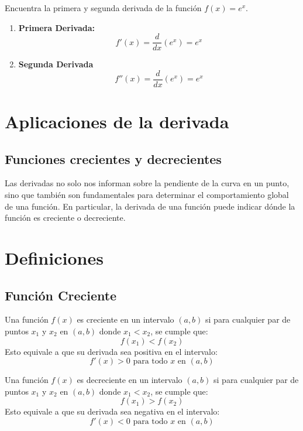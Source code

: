 \begin{example}
    Encuentra la primera y segunda derivada de la función \( f(x) = e^x \).

\begin{enumerate}
    \item \textbf{Primera Derivada:}
    \[
    f'(x) = \frac{d}{dx}(e^x) = e^x
    \]
    
    \item \textbf{Segunda Derivada}
    \[
    f''(x) = \frac{d}{dx}(e^x) = e^x
    \]
\end{enumerate}
\end{example}








\section{Aplicaciones de la derivada} %
\subsection{Funciones crecientes y decrecientes}

Las derivadas no solo nos informan sobre la pendiente de la curva en un punto, sino que también son fundamentales para determinar el comportamiento global de una función. En particular, la derivada de una función puede indicar dónde la función es creciente o decreciente.

\section*{Definiciones}

\subsection*{Función Creciente}
\begin{definition}
    Una función \( f(x) \) es creciente en un intervalo \((a, b)\) si para cualquier par de puntos \( x_1 \) y \( x_2 \) en \((a, b)\) donde \( x_1 < x_2 \), se cumple que:
\[
f(x_1) < f(x_2)
\]
Esto equivale a que su derivada sea positiva en el intervalo:
\[
f'(x) > 0 \text{ para todo } x \text{ en } (a, b)
\]

\end{definition}

\begin{definition}
    Una función \( f(x) \) es decreciente en un intervalo \((a, b)\) si para cualquier par de puntos \( x_1 \) y \( x_2 \) en \((a, b)\) donde \( x_1 < x_2 \), se cumple que:
\[
f(x_1) > f(x_2)
\]
Esto equivale a que su derivada sea negativa en el intervalo:
\[
f'(x) < 0 \text{ para todo } x \text{ en } (a, b)
\]
\end{definition}



